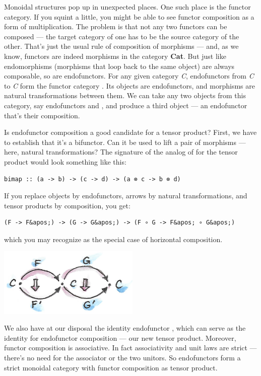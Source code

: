 Monoidal structures pop up in unexpected places. One such place is the
functor category. If you squint a little, you might be able to see
functor composition as a form of multiplication. The problem is that not
any two functors can be composed --- the target category of one has to
be the source category of the other. That's just the usual rule of
composition of morphisms --- and, as we know, functors are indeed
morphisms in the category \textbf{Cat}. But just like endomorphisms
(morphisms that loop back to the same object) are always composable, so
are endofunctors. For any given category \emph{C}, endofunctors from
\emph{C} to \emph{C} form the functor category \code{{[}C,\ C{]}}. Its
objects are endofunctors, and morphisms are natural transformations
between them. We can take any two objects from this category, say
endofunctors  and , and produce a third object
 --- an endofunctor that's their composition.

Is endofunctor composition a good candidate for a tensor product? First,
we have to establish that it's a bifunctor. Can it be used to lift a
pair of morphisms --- here, natural transformations? The signature of
the analog of  for the tensor product would look something
like this:

\begin{verbatim}
bimap :: (a -> b) -> (c -> d) -> (a ⊗ c -> b ⊗ d)
\end{verbatim}

If you replace objects by endofunctors, arrows by natural
transformations, and tensor products by composition, you get:

\begin{verbatim}
(F -> F&apos;) -> (G -> G&apos;) -> (F ∘ G -> F&apos; ∘ G&apos;)
\end{verbatim}

which you may recognize as the special case of horizontal composition.

\includegraphics[width=2.65625in]{images/horizcomp.png}

We also have at our disposal the identity endofunctor , which
can serve as the identity for endofunctor composition --- our new tensor
product. Moreover, functor composition is associative. In fact
associativity and unit laws are strict --- there's no need for the
associator or the two unitors. So endofunctors form a strict monoidal
category with functor composition as tensor product.

